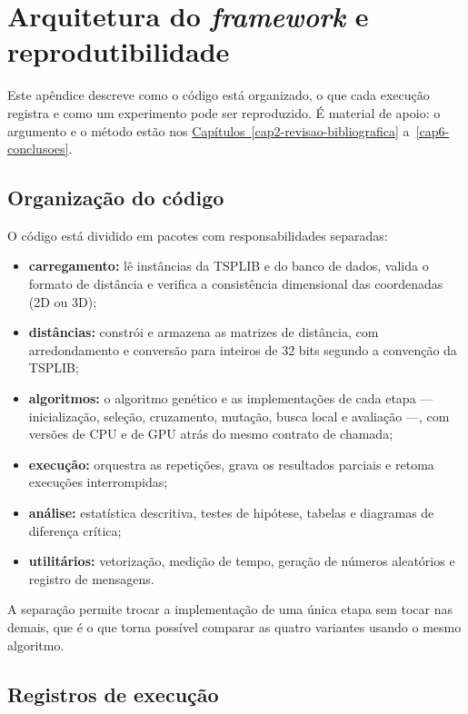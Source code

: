 \chapter{Arquitetura do \emph{framework} e reprodutibilidade}\label{apendice-framework}

Este apêndice descreve como o código está organizado, o que cada execução registra e como um experimento pode ser reproduzido.
É material de apoio: o argumento e o método estão nos \hyperref[cap2-revisao-bibliografica]{Capítulos~\ref*{cap2-revisao-bibliografica}} a~\hyperref[cap6-conclusoes]{\ref*{cap6-conclusoes}}.

\section{Organização do código}\label{apendice-organizacao}

O código está dividido em pacotes com responsabilidades separadas:

\begin{itemize}
  \item
        \textbf{carregamento:} lê instâncias da TSPLIB e do banco de dados, valida o formato de distância e verifica a consistência dimensional das coordenadas (2D ou 3D);
  \item
        \textbf{distâncias:} constrói e armazena as matrizes de distância, com arredondamento e conversão para inteiros de 32 bits segundo a convenção da TSPLIB;
  \item
        \textbf{algoritmos:} o algoritmo genético e as implementações de cada etapa --- inicialização, seleção, cruzamento, mutação, busca local e avaliação ---, com versões de CPU e de GPU atrás do mesmo contrato de chamada;
  \item
        \textbf{execução:} orquestra as repetições, grava os resultados parciais e retoma execuções interrompidas;
  \item
        \textbf{análise:} estatística descritiva, testes de hipótese, tabelas e diagramas de diferença crítica;
  \item
        \textbf{utilitários:} vetorização, medição de tempo, geração de números aleatórios e registro de mensagens.
\end{itemize}

A separação permite trocar a implementação de uma única etapa sem tocar nas demais, que é o que torna possível comparar as quatro variantes usando o mesmo algoritmo.

\section{Registros de execução}\label{apendice-registros}

